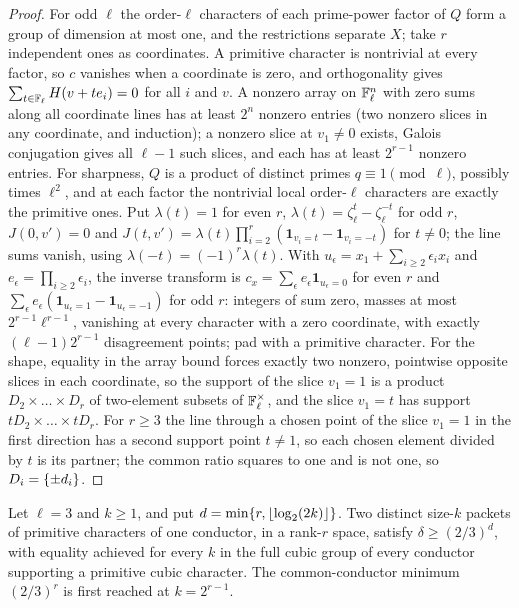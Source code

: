 \begin{proof}
For odd $\ell$ the order-$\ell$ characters of each prime-power factor of $Q$ form a group of dimension at most one,
and the restrictions separate $X$; take $r$ independent ones as coordinates. A primitive character is
nontrivial at every factor, so $c$ vanishes when a coordinate is zero, and orthogonality gives
$\sum_{t\in\mathbb{F}_\ell}H(v+te_i)=0$ for all $i$ and $v$. A nonzero array on $\mathbb{F}_\ell^n$ with zero sums along all coordinate lines has at
least $2^n$ nonzero entries (two nonzero slices in any coordinate, and induction); a nonzero slice at $v_1\ne0$
exists, Galois conjugation gives all $\ell-1$ such slices, and each has at least $2^{r-1}$ nonzero entries.
For sharpness, $Q$ is a product of distinct primes $q\equiv1\pmod\ell$, possibly times $\ell^2$, and at each factor the
nontrivial local order-$\ell$ characters are exactly the primitive ones. Put $\lambda(t)=1$ for even $r$,
$\lambda(t)=\zeta_\ell^t-\zeta_\ell^{-t}$ for odd $r$, $J(0,v')=0$ and $J(t,v')=\lambda(t)\prod_{i=2}^r(\mathbf 1_{v_i=t}-\mathbf 1_{v_i=-t})$ for $t\ne0$; the line
sums vanish, using $\lambda(-t)=(-1)^r\lambda(t)$. With $u_\epsilon=x_1+\sum_{i\ge2}\epsilon_ix_i$ and $e_\epsilon=\prod_{i\ge2}\epsilon_i$, the inverse transform
is $c_x=\sum_\epsilon e_\epsilon\mathbf 1_{u_\epsilon=0}$ for even $r$ and $\sum_\epsilon e_\epsilon(\mathbf 1_{u_\epsilon=1}-\mathbf 1_{u_\epsilon=-1})$ for odd $r$: integers of sum zero,
masses at most $2^{r-1}\ell^{r-1}$, vanishing at every character with a zero coordinate, with exactly $(\ell-1)2^{r-1}$
disagreement points; pad with a primitive character. For the shape, equality in the array bound forces
exactly two nonzero, pointwise opposite slices in each coordinate, so the support of the slice $v_1=1$ is a
product $D_2\times\dots\times D_r$ of two-element subsets of $\mathbb{F}_\ell^\times$, and the slice $v_1=t$ has support $tD_2\times\dots\times tD_r$. For
$r\ge3$ the line through a chosen point of the slice $v_1=1$ in the first direction has a second support point
$t\ne1$, so each chosen element divided by $t$ is its partner; the common ratio squares to one and is not one,
so $D_i=\{\pm d_i\}$.
\end{proof}

\begin{theorem}\label{rec:thm:ocubic}
Let $\ell=3$ and $k\ge1$, and put $d=\min\{r,\lfloor\log_2(2k)\rfloor\}$. Two distinct size-$k$ packets of primitive
characters of one conductor, in a rank-$r$ space, satisfy $\delta\ge(2/3)^d$, with equality achieved for every $k$ in the full cubic
group of every conductor supporting a primitive cubic character. The common-conductor minimum
$(2/3)^r$ is first reached at $k=2^{r-1}$.
\end{theorem}

